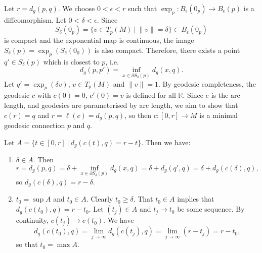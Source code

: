 \documentclass[letter-paper]{tufte-book}
\newenvironment{proof}[1][Proof]{\begin{trivlist}
\item[\hskip \labelsep {\bfseries #1}]}{\end{trivlist}}
\begin{document}
\begin{proof}
  Let $r = d_g(p,q)$. We choose $0<\epsilon<r$ such that $\exp_p: B_\epsilon(0_p) \to B_\epsilon(p)$ is a diffeomorphism. Let $0<\delta<\epsilon$. Since
  \begin{equation*}
    S_\delta(0_p) = \{v\in T_p(M)\ |\ \|v\| = \delta\} \subset B_\epsilon(0_p)
  \end{equation*}
  is compact and the exponential map is continuous, the image $S_\delta(p) = \exp_p(S_\delta(0_0))$ is also compact. Therefore, there exists a point $q' \in S_\delta(p)$ which is closest to $p$, i.e.
  \begin{equation*}
    d_g(p, p') = \inf_{x\in \partial S_\delta(p)} d_g(x,q).
  \end{equation*}
  Let $q' = \exp_p(\delta v)$, $v\in T_p(M)$ and $\|v\|=1$. By geodesic completeness, the geodesic $c$ with $c(0) = 0$, $c'(0) = v$ is defined for all $\mathbb{R}$. Since $e$ is the arc length, and geodesics are parameterised by arc length, we aim to show that $c(r) = q$ and $r = \ell(c) = d_g(p,q)$, so then $c:[0, r]\to M$ is a minimal geodesic connection $p$ and $q$.
  
  Let $A = \{t\in[0, r]\ |\ d_g(c(t), q) = r-t\}$. Then we have:
  \begin{enumerate}
    \item $\delta \in A$. Then
    \begin{equation*}
      r = d_g(p,q) = \delta + \inf_{x\in\partial S_\delta(p)}d_g(x,q) = \delta + d_g(q', q) =\delta + d_g(c(\delta), q),
    \end{equation*}
    so $d_g(c(\delta), q) = r - \delta$.
    
    \item $t_0 = \sup A$ and $t_0 \in A$. Clearly $t_0 \geq \delta$. That $t_0 \in A$ implies that $d_g(c(t_0), q) = r - t_0$. Let $(t_j) \in A$ and $t_j \to t_0$ be some sequence. By continuity, $c(t_j) \to c(t_0)$. We have
    \begin{equation*}
      d_g(c(t_0), q) = \lim_{j\to\infty} d_g(c(t_j), q) = \lim_{j\to\infty}(r - t_j) = r - t_0,
    \end{equation*}
    so that $t_0 = \max A$.
    

\end{enumerate}
\end{proof}
\end{document}
